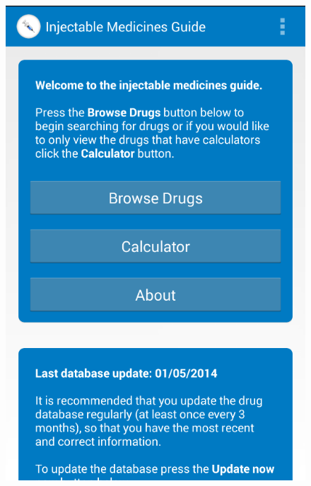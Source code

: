 \begin{figure}[H]
\begin{minipage}{.5\textwidth}
  \includegraphics[width=.8\linewidth]{Images/screenshots/API18/main.png}
\end{minipage}
\end{figure}

